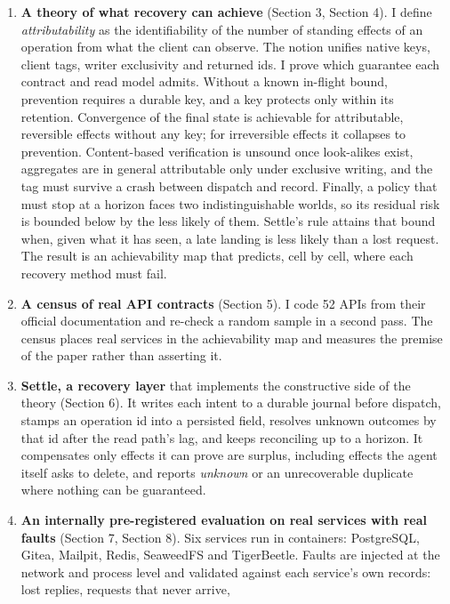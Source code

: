 \documentclass[
  10pt,
]{article}
\providecommand{\tightlist}{%
  \setlength{\itemsep}{0pt}\setlength{\parskip}{0pt}}
\begin{document}
\begin{enumerate}
\def\labelenumi{\arabic{enumi}.}
\tightlist
\item
  \textbf{A theory of what recovery can achieve} (Section 3, Section 4).
  I define \emph{attributability} as the identifiability of the number
  of standing effects of an operation from what the client can observe.
  The notion unifies native keys, client tags, writer exclusivity and
  returned ids. I prove which guarantee each contract and read model
  admits. Without a known in-flight bound, prevention requires a durable
  key, and a key protects only within its retention. Convergence of the
  final state is achievable for attributable, reversible effects without
  any key; for irreversible effects it collapses to prevention.
  Content-based verification is unsound once look-alikes exist,
  aggregates are in general attributable only under exclusive writing,
  and the tag must survive a crash between dispatch and record. Finally,
  a policy that must stop at a horizon faces two indistinguishable
  worlds, so its residual risk is bounded below by the less likely of
  them. Settle's rule attains that bound when, given what it has seen, a
  late landing is less likely than a lost request. The result is an
  achievability map that predicts, cell by cell, where each recovery
  method must fail.
\item
  \textbf{A census of real API contracts} (Section 5). I code 52 APIs
  from their official documentation and re-check a random sample in a
  second pass. The census places real services in the achievability map
  and measures the premise of the paper rather than asserting it.
\item
  \textbf{Settle, a recovery layer} that implements the constructive
  side of the theory (Section 6). It writes each intent to a durable
  journal before dispatch, stamps an operation id into a persisted
  field, resolves unknown outcomes by that id after the read path's lag,
  and keeps reconciling up to a horizon. It compensates only effects it
  can prove are surplus, including effects the agent itself asks to
  delete, and reports \emph{unknown} or an unrecoverable duplicate where
  nothing can be guaranteed.
\item
  \textbf{An internally pre-registered evaluation on real services with
  real faults} (Section 7, Section 8). Six services run in containers:
  PostgreSQL, Gitea, Mailpit, Redis, SeaweedFS and TigerBeetle. Faults
  are injected at the network and process level and validated against
  each service's own records: lost replies, requests that never arrive,

\end{enumerate}
\end{document}
